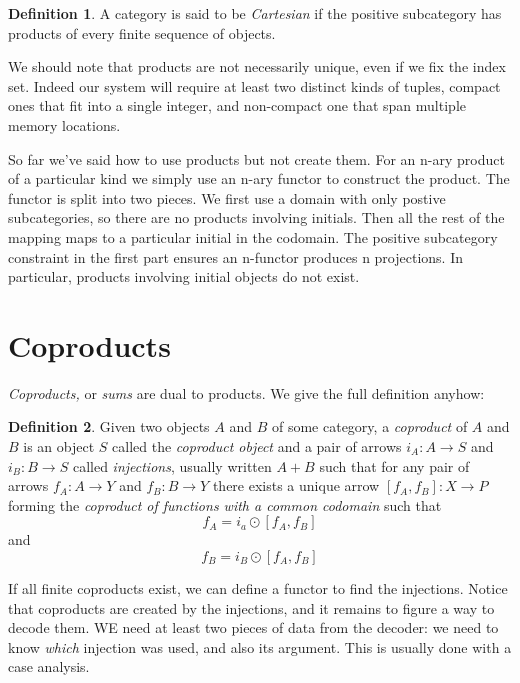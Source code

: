 \documentclass[oneside]{book}
\theoremstyle{plain}
\theoremstyle{definition}
\newtheorem{definition}{Definition}
\theoremstyle{plain}
\def\leftsquare{\left[}
\def\rightsquare{\right]}
\begin{document}
\begin{definition}
A category is said to be {\em Cartesian} if the positive subcategory has products
of every finite sequence of objects.
\end{definition}

We should note that products are not necessarily unique, 
even if we fix the index set. Indeed our system will require
at least two distinct kinds of tuples, compact ones that fit
into a single integer, and non-compact one that span multiple
memory locations.

So far we've said how to use products but not create them.
For an n-ary product of a particular kind we simply use an n-ary functor
to construct the product. The functor is split into two pieces.
We first use a domain with only postive subcategories, so there
are no products involving initials. Then all the rest of the 
mapping maps to a particular initial in the codomain.
The positive subcategory constraint in the first part ensures an
n-functor produces n projections. In particular, products involving initial
objects do not exist.

\section{Coproducts}
{\em Coproducts,} or {\em sums} are dual to products. We give the full
definition anyhow:
\begin{definition}
Given two objects $A$ and $B$ of some category, a {\em coproduct} of $A$ and $B$
is an object $S$ called the {\em coproduct object} and a 
pair of arrows $i_A:A \rightarrow S$ and $i_B: B \rightarrow S$ called {\em injections}, 
usually written $A + B$ such that for any pair of arrows $f_A:A \rightarrow Y$ and
$f_B: B \rightarrow Y$ there exists a unique arrow  
$\leftsquare f_A, f_B \rightsquare: X \rightarrow P$ forming the {\em coproduct of functions
with a common codomain} such that
$$f_A = i_a \odot \leftsquare f_A, f_B \rightsquare$$ 
and
$$f_B = i_B \odot \leftsquare f_A, f_B \rightsquare$$ 
\end{definition} 

If all finite coproducts exist, we can define a functor
to find the injections. Notice that coproducts are created by
the injections, and it remains to figure a way to decode them.
WE need at least two pieces of data from the decoder: we need
to know {\em which} injection was used, and also its argument.
This is usually done with a case analysis.
\end{document}
